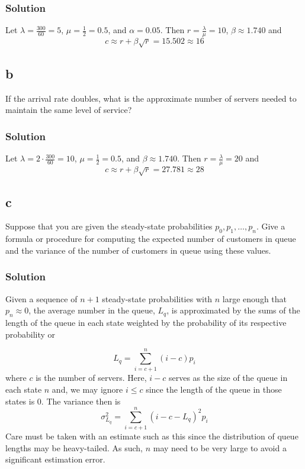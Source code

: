 \documentclass[letterpaper]{amsart}
\begin{document}
\subsubsection*{Solution}
Let $\lambda = \frac{300}{60}=5$, $\mu=\frac{1}{2}=0.5$, and $\alpha=0.05$. Then
$r=\frac{\lambda}{\mu}=10$, $\beta\approx1.740$ and
\begin{equation*}
  c\approx r + \beta\sqrt{r} = 15.502 \approx 16
\end{equation*}

\subsection*{b}
If the arrival rate doubles, what is the approximate number of servers
needed to maintain the same level of service?

\subsubsection*{Solution}
Let $\lambda = 2\cdot\frac{300}{60}=10$, $\mu=\frac{1}{2}=0.5$, and $\beta\approx1.740$. Then
$r=\frac{\lambda}{\mu}=20$ and
\begin{equation*}
  c\approx r + \beta\sqrt{r} = 27.781 \approx 28
\end{equation*}

\subsection*{c}
Suppose that you are given the steady-state probabilities $p_0,p_1,\ldots,p_n$.
Give a formula or procedure for computing the expected number of
customers in queue and the variance of the number of customers in
queue using these values.

\subsubsection*{Solution}
Given a sequence of $n+1$ steady-state probabilities with $n$ large enough that
$p_n \approx 0$, the average number in the queue, $L_q$, is approximated by the
sums of the length of the queue in each state weighted by the probability of its
respective probability or


\begin{equation*}
  L_q = \sum_{i=c+1}^n(i-c)p_i
\end{equation*}
where $c$ is the number of servers.
Here, $i-c$ serves as the size of the queue in each state $n$ and, we may ignore
$i\leq c$ since the length of the queue in those states is 0.
The variance then is
\begin{equation*}
  \sigma_{L_q}^2 = \sum_{i=c+1}^n(i-c-L_q)^2p_i
\end{equation*}
Care must be taken with an estimate such as this since the distribution of queue
lengths may be heavy-tailed.
As such, $n$ may need to be very large to avoid a significant estimation error.
\end{document}
